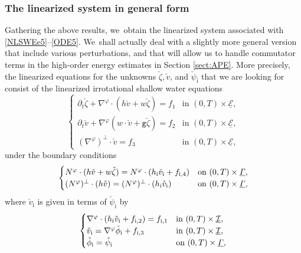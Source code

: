 \documentclass[10pt]{amsart}
\newcommand{\gr}{{\mathtt g}}
\newcommand{\dt}{\partial_t}
\newcommand{\cI}{{\mathcal I}}
\newcommand{\cE}{{\mathcal E}}
\newcommand{\ul}[1]{\underline{#1}}
\newcommand{\itGamma}{\mathit{\Gamma}}
\theoremstyle{definition}
\begin{document}
\subsubsection{The linearized system in general form}
Gathering the above results, we~obtain the linearized system associated with \eqref{NLSWEe5}--\eqref{ODE5}. We~shall actually deal with a slightly more general version that include various perturbations,
and that will allow us to handle commutator terms in the high-order energy estimates in Section \ref{sect:APE}.
More precisely, the linearized equations for the unknowns $\check{\zeta},\check{v}$, and $\check{\psi}_\mathrm{i}$
that we are looking for consist of the linearized irrotational shallow water equations
\begin{equation}\label{LSWEe2}
\begin{cases}
\dt\check{\zeta}+\nabla^\varphi\cdot(h\check{v}+w\check{\zeta}) = f_1 &\text{in } (0,T)\times\ul{\cE}, \\
\dt\check{v}+\nabla^\varphi(w\cdot\check{v}+\gr\check{\zeta}) = f_2 &\text{in } (0,T)\times\ul{\cE}, \\
(\nabla^\varphi)^\perp\cdot\check{v} = f_3 &\text{in } (0,T)\times\ul{\cE},
\end{cases}
\end{equation}
under the boundary conditions
\begin{equation}\label{LBC4}
\begin{cases}
N^\varphi\cdot(h\check{v}+w\check{\zeta}) = N^\varphi\cdot(h_\mathrm{i}\check{v}_\mathrm{i}+f_{{\rm i},4}) &\text{on } (0,T)\times\ul{\itGamma}, \\
(N^\varphi)^\perp\cdot(h\check{v})=(N^\varphi)^\perp\cdot(h_\mathrm{i}\check{v}_\mathrm{i}) &\text{on } (0,T)\times\ul{\itGamma},
\end{cases}
\end{equation}
where $\check{v}_\mathrm{i}$ is given in terms of $\check{\psi}_\mathrm{i}$ by
\begin{equation}\label{LSWEi2}
\begin{cases}
\nabla^\varphi\cdot(h_\mathrm{i}\check{v}_\mathrm{i}+f_{{\rm i},2})=f_{{\rm i},1} &\text{in } (0,T)\times\ul{\cI}, \\
\check{v}_\mathrm{i}=\nabla^\varphi\check{\phi}_\mathrm{i} + f_{{\rm i},3} &\text{in } (0,T)\times\ul{\cI}, \\
\check{\phi}_\mathrm{i}=\check{\psi}_\mathrm{i} &\text{on } (0,T)\times\ul{\itGamma},
\end{cases}
\end{equation}
\end{document}
